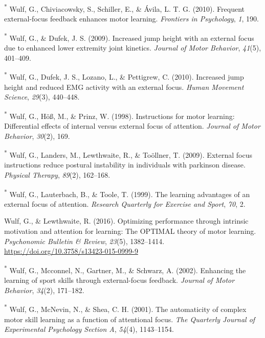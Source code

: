\documentclass[
  man, donotrepeattitle,floatsintext]{apa7}
\newlength{\cslhangindent}
\newlength{\cslentryspacingunit} %
\newenvironment{CSLReferences}[2] %
 {%
  \setlength{\parindent}{0pt}
  \ifodd #1
  \let\oldpar\par
  \def\par{\hangindent=\cslhangindent\oldpar}
  \fi
  \setlength{\parskip}{#2\cslentryspacingunit}
 }%
 {}
\begin{document}
\begin{CSLReferences}{1}{0}
\leavevmode{}%
\textsuperscript{*} Wulf, G., Chiviacowsky, S., Schiller, E., \& Ávila, L. T. G. (2010). Frequent external-focus feedback enhances motor learning. \emph{Frontiers in Psychology}, \emph{1}, 190.

\leavevmode{}%
\textsuperscript{*} Wulf, G., \& Dufek, J. S. (2009). Increased jump height with an external focus due to enhanced lower extremity joint kinetics. \emph{Journal of Motor Behavior}, \emph{41}(5), 401--409.

\leavevmode{}%
\textsuperscript{*} Wulf, G., Dufek, J. S., Lozano, L., \& Pettigrew, C. (2010). Increased jump height and reduced EMG activity with an external focus. \emph{Human Movement Science}, \emph{29}(3), 440--448.

\leavevmode{}%
\textsuperscript{*} Wulf, G., Höß, M., \& Prinz, W. (1998). Instructions for motor learning: Differential effects of internal versus external focus of attention. \emph{Journal of Motor Behavior}, \emph{30}(2), 169.

\leavevmode{}%
\textsuperscript{*} Wulf, G., Landers, M., Lewthwaite, R., \& Toöllner, T. (2009). External focus instructions reduce postural instability in individuals with parkinson disease. \emph{Physical Therapy}, \emph{89}(2), 162--168.

\leavevmode{}%
\textsuperscript{*} Wulf, G., Lauterbach, B., \& Toole, T. (1999). The learning advantages of an external focus of attention. \emph{Research Quarterly for Exercise and Sport}, \emph{70}, 2.

\leavevmode{}%
Wulf, G., \& Lewthwaite, R. (2016). Optimizing performance through intrinsic motivation and attention for learning: {The OPTIMAL} theory of motor learning. \emph{Psychonomic Bulletin \& Review}, \emph{23}(5), 1382--1414. \url{https://doi.org/10.3758/s13423-015-0999-9}

\leavevmode{}%
\textsuperscript{*} Wulf, G., Mcconnel, N., Gartner, M., \& Schwarz, A. (2002). Enhancing the learning of sport skills through external-focus feedback. \emph{Journal of Motor Behavior}, \emph{34}(2), 171--182.

\leavevmode{}%
\textsuperscript{*} Wulf, G., McNevin, N., \& Shea, C. H. (2001). The automaticity of complex motor skill learning as a function of attentional focus. \emph{The Quarterly Journal of Experimental Psychology Section A}, \emph{54}(4), 1143--1154.


\end{CSLReferences}
\end{document}
